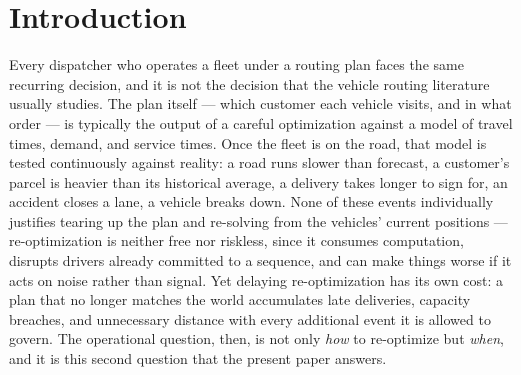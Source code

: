 \documentclass[trsc,dblanonrev]{informs4}
\begin{document}

\maketitle

\section{Introduction}\label{sec:intro}

Every dispatcher who operates a fleet under a routing plan faces the
same recurring decision, and it is not the decision that the vehicle
routing literature usually studies. The plan itself --- which customer
each vehicle visits, and in what order --- is typically the output of
a careful optimization against a model of travel times, demand, and
service times. Once the fleet is on the road, that model is tested
continuously against reality: a road runs slower than forecast, a
customer's parcel is heavier than its historical average, a delivery
takes longer to sign for, an accident closes a lane, a vehicle breaks
down. None of these events individually justifies tearing up the plan
and re-solving from the vehicles' current positions --- re-optimization
is neither free nor riskless, since it consumes computation, disrupts
drivers already committed to a sequence, and can make things worse if
it acts on noise rather than signal. Yet delaying re-optimization has
its own cost: a plan that no longer matches the world accumulates late
deliveries, capacity breaches, and unnecessary distance with every
additional event it is allowed to govern. The operational question,
then, is not only \emph{how} to re-optimize but \emph{when}, and it is
this second question that the present paper answers.
\end{document}
